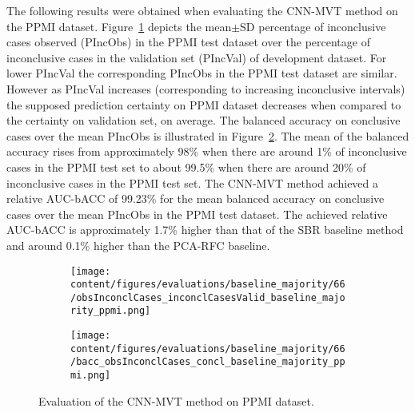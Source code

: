 The following results were obtained when evaluating the CNN-MVT method on the PPMI dataset.
Figure~\ref{fig:obsInconclCases_inconclCasesValid_baseline_majority_ppmi} depicts the
mean$\pm$SD percentage of inconclusive cases observed (PIncObs) in the PPMI test dataset 
over the percentage of inconclusive cases in the validation set (PIncVal) of development dataset.
For lower PIncVal the corresponding PIncObs in the PPMI test dataset are similar.
However as PIncVal increases (corresponding to increasing inconclusive intervals) 
the supposed prediction certainty on PPMI dataset decreases when compared to the certainty on validation set, on average.
The balanced accuracy on conclusive cases over the mean PIncObs is illustrated 
in Figure~\ref{fig:bacc_obsInconclCases_concl_baseline_majority_ppmi}.
The mean of the balanced accuracy rises from approximately 98\% 
when there are around 1\% of inconclusive cases in the PPMI test set to about 99.5\% 
when there are around 20\% of inconclusive cases in the PPMI test set.
The CNN-MVT method achieved a relative AUC-bACC of 99.23\% for the mean balanced accuracy on conclusive cases 
over the mean PIncObs in the PPMI test dataset.
The achieved relative AUC-bACC is approximately 1.7\% higher than that of the SBR baseline method 
and around 0.1\% higher than the PCA-RFC baseline.

\begin{figure}[ht]
  \begin{subfigure}{0.49\textwidth}
    \centering
    \texttt{[image: content/figures/evaluations/baseline\_majority/66/obsInconclCases\_inconclCasesValid\_baseline\_majority\_ppmi.png]}
    \label{fig:obsInconclCases_inconclCasesValid_baseline_majority_ppmi}
  \end{subfigure}
  \hfill
  \begin{subfigure}{0.49\textwidth}
    \centering
    \texttt{[image: content/figures/evaluations/baseline\_majority/66/bacc\_obsInconclCases\_concl\_baseline\_majority\_ppmi.png]}
    \label{fig:bacc_obsInconclCases_concl_baseline_majority_ppmi}
  \end{subfigure}
  \caption{Evaluation of the CNN-MVT method on PPMI dataset.}
  \label{fig:perf_results_mvt_ppmi}
\end{figure}



